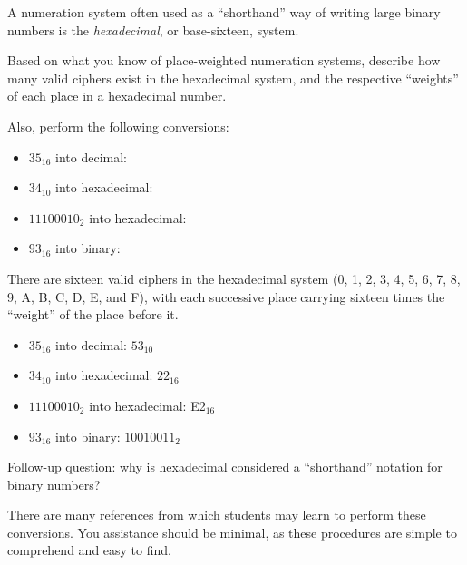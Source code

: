 

A numeration system often used as a ``shorthand'' way of writing large binary numbers is the {\it hexadecimal}, or base-sixteen, system.

Based on what you know of place-weighted numeration systems, describe how many valid ciphers exist in the hexadecimal system, and the respective ``weights'' of each place in a hexadecimal number.

Also, perform the following conversions:

\begin{itemize}
\item{} $35_{16}$ into decimal:
\vskip 5pt
\item{} $34_{10}$ into hexadecimal:
\vskip 5pt
\item{} $11100010_{2}$ into hexadecimal:
\vskip 5pt
\item{} $93_{16}$ into binary:
\end{itemize}







There are sixteen valid ciphers in the hexadecimal system (0, 1, 2, 3, 4, 5, 6, 7, 8, 9, A, B, C, D, E, and F), with each successive place carrying sixteen times the ``weight'' of the place before it.

\begin{itemize}
\item{} $35_{16}$ into decimal: $53_{10}$
\vskip 5pt
\item{} $34_{10}$ into hexadecimal: $22_{16}$
\vskip 5pt
\item{} $11100010_{2}$ into hexadecimal: E2$_{16}$
\vskip 5pt
\item{} $93_{16}$ into binary: $10010011_2$
\end{itemize}

\vskip 10pt

Follow-up question: why is hexadecimal considered a ``shorthand'' notation for binary numbers?







There are many references from which students may learn to perform these conversions.  You assistance should be minimal, as these procedures are simple to comprehend and easy to find.





